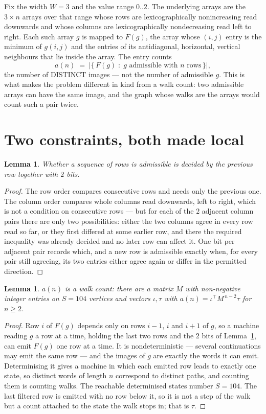 \documentclass[11pt,a4paper]{article}
\theoremstyle{plain}
\newtheorem{lemma}[theorem]{Lemma}
\theoremstyle{definition}
\begin{document}
Fix the width $W=3$ and the value range $0..2$. The underlying arrays are the
$3\times n$ arrays over that range whose rows are lexicographically nonincreasing read downwards
and whose columns are lexicographically nondecreasing read left to right. Each such array $g$
is mapped to $F(g)$, the array whose $(i,j)$ entry is the minimum of $g(i,j)$ and the entries
of its antidiagonal, horizontal, vertical neighbours that lie inside the array. The entry counts
\[
a(n)\;=\;\bigl|\{\,F(g)\;:\;g\text{ admissible with }n\text{ rows}\,\}\bigr|,
\]
the number of DISTINCT images --- not the number of admissible $g$. This is what makes the
problem different in kind from a walk count: two admissible arrays can have the same image, and
the graph whose walks are the arrays would count such a pair twice.

\section{Two constraints, both made local}

\begin{lemma}\label{lem:local}
Whether a sequence of rows is admissible is decided by the previous row together with
$2$ bits.
\end{lemma}

\begin{proof}
The row order compares consecutive rows and needs only the previous one. The column order
compares whole columns read downwards, left to right, which is not a condition on consecutive
rows --- but for each of the $2$ adjacent column pairs there are only two possibilities:
either the two columns agree in every row read so far, or they first differed at some earlier
row, and there the required inequality was already decided and no later row can affect it. One
bit per adjacent pair records which, and a new row is admissible exactly when, for every pair
still agreeing, its two entries either agree again or differ in the permitted direction.
\end{proof}

\begin{lemma}\label{lem:det}
$a(n)$ is a walk count: there are a matrix $M$ with non-negative integer entries on $S=104$
vertices and vectors $\iota,\tau$ with $a(n)=\iota^{\!\top}M^{\,n-2}\tau$ for $n\ge2$.
\end{lemma}

\begin{proof}
Row $i$ of $F(g)$ depends only on rows $i-1$, $i$ and $i+1$ of $g$, so a machine reading $g$ a
row at a time, holding the last two rows and the $2$ bits of Lemma~\ref{lem:local}, can
emit $F(g)$ one row at a time. It is nondeterministic --- several continuations may emit the
same row --- and the images of $g$ are exactly the words it can emit. Determinising it gives a
machine in which each emitted row leads to exactly one state, so distinct words of length $n$
correspond to distinct paths, and counting them is counting walks. The reachable determinised
states number $S=104$. The last filtered row is emitted with no row below it, so it is not a
step of the walk but a count attached to the state the walk stops in; that is $\tau$.
\end{proof}
\end{document}
